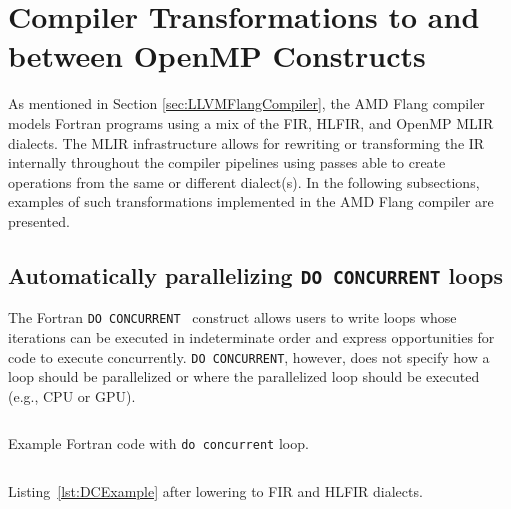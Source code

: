 \documentclass[acmtog,natbib=false]{acmart}
\newcommand{\code}[1]{\texttt{#1}\xspace}
\begin{document}
\section{Compiler Transformations to and between OpenMP Constructs}
\label{sec:CompilerTransOpenMP}

As mentioned in Section \ref{sec:LLVMFlangCompiler}, the AMD Flang compiler models Fortran programs using a mix of the \ac{FIR}, \ac{HLFIR}, and OpenMP \ac{MLIR} dialects.
The \ac{MLIR} infrastructure allows for rewriting or transforming the \ac{IR} internally throughout the compiler pipelines using passes able to create operations from the same or different dialect(s).
In the following subsections, examples of such transformations implemented in the AMD Flang compiler are presented.

\subsection{Automatically parallelizing \code{DO CONCURRENT} loops}
\label{sec:DCPar}

The Fortran \code{DO CONCURRENT}~\cite{F2023} construct allows users to write loops whose iterations can be executed in indeterminate order and express opportunities for code to execute concurrently.
\code{DO CONCURRENT}, however, does not specify how a loop should be parallelized or where the parallelized loop should be executed (e.g., CPU or GPU).

\begin{listing}[t]
\inputminted{Fortran}{code/dc_saxpy.f90}
\caption{Example Fortran code with \code{do concurrent} loop.}
\label{lst:DCExample}
\end{listing}

\begin{listing}[t]
\inputminted{MLIR-lexer.py:MlirLexer -x}{code/dc_fir.mlir}
\caption{Listing~\ref{lst:DCExample} after lowering to \acs{FIR} and \acs{HLFIR} dialects.}
\label{lst:DCFIRExample}
\end{listing}
\end{document}
